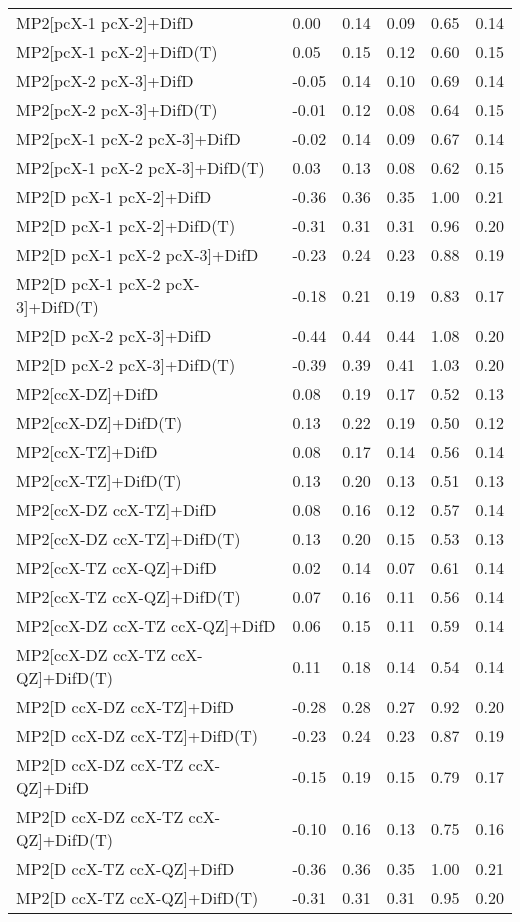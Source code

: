 \begin{table}
\begin{tabular}{l l l l l l }
    MP2[pcX-1 pcX-2]+DifD & 0.00 & 0.14 & 0.09 & 0.65 & 0.14 \\ 
    MP2[pcX-1 pcX-2]+DifD(T) & 0.05 & 0.15 & 0.12 & 0.60 & 0.15 \\ 
    MP2[pcX-2 pcX-3]+DifD & -0.05 & 0.14 & 0.10 & 0.69 & 0.14 \\ 
    MP2[pcX-2 pcX-3]+DifD(T) & -0.01 & 0.12 & 0.08 & 0.64 & 0.15 \\ 
    MP2[pcX-1 pcX-2 pcX-3]+DifD & -0.02 & 0.14 & 0.09 & 0.67 & 0.14 \\ 
    MP2[pcX-1 pcX-2 pcX-3]+DifD(T) & 0.03 & 0.13 & 0.08 & 0.62 & 0.15 \\ 
    MP2[D pcX-1 pcX-2]+DifD & -0.36 & 0.36 & 0.35 & 1.00 & 0.21 \\ 
    MP2[D pcX-1 pcX-2]+DifD(T) & -0.31 & 0.31 & 0.31 & 0.96 & 0.20 \\ 
    MP2[D pcX-1 pcX-2 pcX-3]+DifD & -0.23 & 0.24 & 0.23 & 0.88 & 0.19 \\ 
    MP2[D pcX-1 pcX-2 pcX-3]+DifD(T) & -0.18 & 0.21 & 0.19 & 0.83 & 0.17 \\ 
    MP2[D pcX-2 pcX-3]+DifD & -0.44 & 0.44 & 0.44 & 1.08 & 0.20 \\ 
    MP2[D pcX-2 pcX-3]+DifD(T) & -0.39 & 0.39 & 0.41 & 1.03 & 0.20 \\ 
    MP2[ccX-DZ]+DifD & 0.08 & 0.19 & 0.17 & 0.52 & 0.13 \\ 
    MP2[ccX-DZ]+DifD(T) & 0.13 & 0.22 & 0.19 & 0.50 & 0.12 \\ 
    MP2[ccX-TZ]+DifD & 0.08 & 0.17 & 0.14 & 0.56 & 0.14 \\ 
    MP2[ccX-TZ]+DifD(T) & 0.13 & 0.20 & 0.13 & 0.51 & 0.13 \\ 
    MP2[ccX-DZ ccX-TZ]+DifD & 0.08 & 0.16 & 0.12 & 0.57 & 0.14 \\ 
    MP2[ccX-DZ ccX-TZ]+DifD(T) & 0.13 & 0.20 & 0.15 & 0.53 & 0.13 \\ 
    MP2[ccX-TZ ccX-QZ]+DifD & 0.02 & 0.14 & 0.07 & 0.61 & 0.14 \\ 
    MP2[ccX-TZ ccX-QZ]+DifD(T) & 0.07 & 0.16 & 0.11 & 0.56 & 0.14 \\ 
    MP2[ccX-DZ ccX-TZ ccX-QZ]+DifD & 0.06 & 0.15 & 0.11 & 0.59 & 0.14 \\ 
    MP2[ccX-DZ ccX-TZ ccX-QZ]+DifD(T) & 0.11 & 0.18 & 0.14 & 0.54 & 0.14 \\ 
    MP2[D ccX-DZ ccX-TZ]+DifD & -0.28 & 0.28 & 0.27 & 0.92 & 0.20 \\ 
    MP2[D ccX-DZ ccX-TZ]+DifD(T) & -0.23 & 0.24 & 0.23 & 0.87 & 0.19 \\ 
    MP2[D ccX-DZ ccX-TZ ccX-QZ]+DifD & -0.15 & 0.19 & 0.15 & 0.79 & 0.17 \\ 
    MP2[D ccX-DZ ccX-TZ ccX-QZ]+DifD(T) & -0.10 & 0.16 & 0.13 & 0.75 & 0.16 \\ 
    MP2[D ccX-TZ ccX-QZ]+DifD & -0.36 & 0.36 & 0.35 & 1.00 & 0.21 \\ 
    MP2[D ccX-TZ ccX-QZ]+DifD(T) & -0.31 & 0.31 & 0.31 & 0.95 & 0.20 \\ 
    \bottomrule
  \end{tabular}
\end{table}
